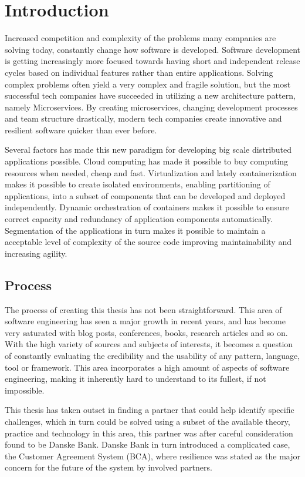 \chapter{Introduction}
\label{ch:introduction}
Increased competition and complexity of the problems many companies are solving today, constantly change how software is developed. Software development is getting increasingly more focused towards having short and independent release cycles based on individual features rather than entire applications. Solving complex problems often yield a very complex and fragile solution, but the most successful tech companies have succeeded in utilizing a new architecture pattern, namely Microservices. By creating microservices, changing development processes and team structure drastically, modern tech companies create innovative and resilient software quicker than ever before.

Several factors has made this new paradigm for developing big scale distributed applications possible. Cloud computing has made it possible to buy computing resources when needed, cheap and fast. Virtualization and lately containerization makes it possible to create isolated environments, enabling partitioning of applications, into a subset of components that can be developed and deployed independently. Dynamic orchestration of containers makes it possible to ensure correct capacity and redundancy of application components automatically. Segmentation of the applications in turn makes it possible to maintain a acceptable level of complexity of the source code improving maintainability and increasing agility.

\section{Process}
The process of creating this thesis has not been straightforward. This area of software engineering has seen a major growth in recent years, and has become very saturated with blog posts, conferences, books, research articles and so on. With the high variety of sources and subjects of interests, it becomes a question of constantly evaluating the credibility and the usability of any pattern, language, tool or framework. This area incorporates a high amount of aspects of software engineering, making it inherently hard to understand to its fullest, if not impossible. 

This thesis has taken outset in finding a partner that could help identify specific challenges, which in turn could be solved using a subset of the available theory, practice and technology in this area, this partner was after careful consideration found to be Danske Bank. Danske Bank in turn introduced a complicated case, the Customer Agreement System (BCA), where resilience was stated as the major concern for the future of the system by involved partners. 


